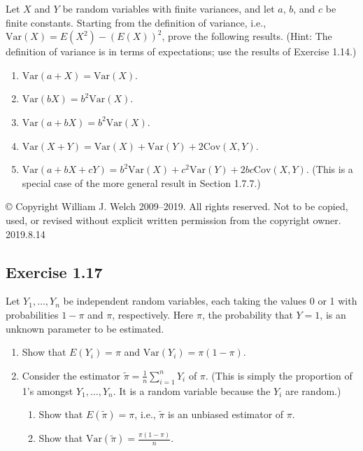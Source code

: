 \documentclass{book}
\begin{document}
Let $X$ and $Y$ be random variables with finite variances, and let $a$, $b$, and $c$ be finite constants. Starting from the definition of variance, i.e., $\text{Var}(X) = E(X^2) - (E(X))^2$, prove the following results. (Hint: The definition of variance is in terms of expectations; use the results of Exercise 1.14.)
\begin{enumerate}
    \item $\text{Var}(a + X) = \text{Var}(X)$.
    \item $\text{Var}(bX) = b^2 \text{Var}(X)$.
    \item $\text{Var}(a + bX) = b^2 \text{Var}(X)$.
    \item $\text{Var}(X + Y) = \text{Var}(X) + \text{Var}(Y) + 2\text{Cov}(X, Y)$.
    \item $\text{Var}(a + bX + cY) = b^2 \text{Var}(X) + c^2 \text{Var}(Y) + 2bc\text{Cov}(X, Y)$.  (This is a special case of the more general result in Section 1.7.7.)
\end{enumerate}

© Copyright William J. Welch 2009--2019. All rights reserved. Not to be copied, used, or revised without explicit written permission from the copyright owner. 2019.8.14


\subsection{Exercise 1.17}
Let $Y_1, \ldots, Y_n$ be independent random variables, each taking the values 0 or 1 with probabilities $1 - \pi$ and $\pi$, respectively. Here $\pi$, the probability that $Y = 1$, is an unknown parameter to be estimated. 
\begin{enumerate}
    \item Show that $E(Y_i) = \pi$ and $\text{Var}(Y_i) = \pi(1 - \pi)$. 
    \item Consider the estimator $\tilde{\pi} = \frac{1}{n}\sum_{i=1}^n Y_i$ of $\pi$. (This is simply the proportion of 1’s amongst $Y_1, \ldots, Y_n$. It is a random variable because the $Y_i$ are random.)
    \begin{enumerate}
        \item Show that $E(\tilde{\pi}) = \pi$, i.e., $\tilde{\pi}$ is an unbiased estimator of $\pi$. 
        \item Show that $\text{Var}(\tilde{\pi}) = \frac{\pi(1 - \pi)}{n}$.
    \end{enumerate}
\end{enumerate}
\end{document}
